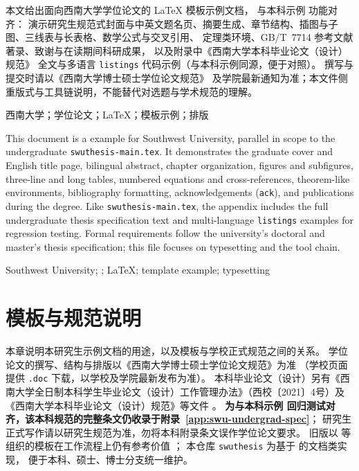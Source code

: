 \begin{cnabstract}
本文给出面向西南大学\swuThesisTierZh 学位论文的 \LaTeX{} 模板示例文档，%
与本科示例  功能对齐：%
演示研究生规范式封面与中英文题名页、摘要生成、章节结构、插图与子图、三线表与长表格、数学公式与交叉引用、%
定理类环境、GB/T~7714 参考文献著录、致谢与在读期间科研成果，%
以及附录中《西南大学本科毕业论文（设计）规范》%
全文与多语言 \texttt{listings} 代码示例（与本科示例同源，便于对照）。%
撰写与提交时请以《西南大学博士硕士学位论文规范》%
及学院最新通知为准；本文件侧重版式与工具链说明，不能替代对选题与学术规范的理解。
\end{cnabstract}
\begin{cnkeywords}
西南大学；\swuThesisTierZh 学位论文；\LaTeX；模板示例；排版
\end{cnkeywords}
\begin{enabstract}
This document is a \swuThesisEnDocRole{} example for Southwest University, %
parallel in scope to the undergraduate \texttt{swuthesis-main.tex}. %
It demonstrates the graduate cover and English title page, bilingual abstract, %
chapter organization, figures and subfigures, %
three-line and long tables, numbered equations and cross-references, %
theorem-like environments, bibliography formatting, acknowledgements (\texttt{ack}), %
and publications during the degree. %
Like \texttt{swuthesis-main.tex}, the appendix includes %
the full undergraduate thesis specification text and %
multi-language \texttt{listings} examples for regression testing. %
Formal requirements follow the university's doctoral and master's thesis specification;%
this file focuses on typesetting and the tool chain.
\end{enabstract}
\begin{enkeywords}
Southwest University; \swuThesisEnDocRole; \LaTeX; template example; typesetting
\end{enkeywords}
\makeabstract

\mainmatter
\chapter{模板与规范说明}\label{ch:doctor-guide}

本章说明本研究生示例文档的用途，以及模板与学校正式规范之间的关系。%
\swuThesisTierZh 学位论文的撰写、结构与排版以《西南大学博士硕士学位论文规范》为准%
\cite{swu2022gradThesisSpecDoc}%
（学校页面提供 \texttt{.doc} 下载，以学校及学院最新发布为准）。%
本科毕业论文（设计）另有《西南大学全日制本科学生毕业论文（设计）工作管理办法》（西校〔2021〕4号）及%
《西南大学本科毕业论文（设计）规范》等文件%
\cite{swu2021thesisManageNotice,swuUndergradThesisSpecWeb}。%
\textbf{为与本科示例  回归测试对齐，该本科规范的完整条文仍收录于附录~\ref{app:swu-undergrad-spec}}；
研究生正式写作请以研究生规范为准，勿将本科附录条文误作\swuThesisTierZh 学位论文要求。
旧版以  等组织的模板在工作流程上仍有参考价值%
\cite{bao2024swuthesisLegacy}；%
本仓库 \texttt{swuthesis} 为基于  的文档类实现，%
便于本科、硕士、博士分支统一维护。

